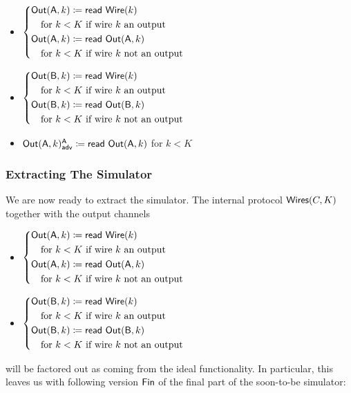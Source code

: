 \begin{itemize}
\item $\begin{cases*} \Out(\A,k) \coloneqq \read{\Wire(k)} \\ \hspace{10pt} \text{for $k < K$ if wire $k$ an output} \\ \Out(\A,k) \coloneqq \read{\Out(\A,k)} \\ \hspace{10pt} \text{for $k < K$ if wire $k$ not an output} \end{cases*}$
\item $\begin{cases*} \Out(\B,k) \coloneqq \read{\Wire(k)} \\ \hspace{10pt} \text{for $k < K$ if wire $k$ an output} \\ \Out(\B,k) \coloneqq \read{\Out(\B,k)} \\ \hspace{10pt} \text{for $k < K$ if wire $k$ not an output} \end{cases*}$
\item {\color{blue} $\mathsf{Out}(\mathsf{A},k)^{\mathsf{A}}_{\mathsf{adv}} \coloneqq \mathsf{read} \ \mathsf{Out}(\mathsf{A},k)$ for $k < K$}
\end{itemize}

\subsubsection{Extracting The Simulator}\label{sect:gmw_extracting_simulator}
We are now ready to extract the simulator. The internal protocol $\mathsf{Wires}(C,K)$ together with the output channels
\begin{itemize}
\item $\begin{cases*} \Out(\A,k) \coloneqq \read{\Wire(k)} \\ \hspace{10pt} \text{for $k < K$ if wire $k$ an output} \\ \Out(\A,k) \coloneqq \read{\Out(\A,k)} \\ \hspace{10pt} \text{for $k < K$ if wire $k$ not an output} \end{cases*}$
\item $\begin{cases*} \Out(\B,k) \coloneqq \read{\Wire(k)} \\ \hspace{10pt} \text{for $k < K$ if wire $k$ an output} \\ \Out(\B,k) \coloneqq \read{\Out(\B,k)} \\ \hspace{10pt} \text{for $k < K$ if wire $k$ not an output} \end{cases*}$
\end{itemize}
will be factored out as coming from the ideal functionality. In particular, this leaves us with following version $\mathsf{Fin}$ of the final part of the soon-to-be simulator:

